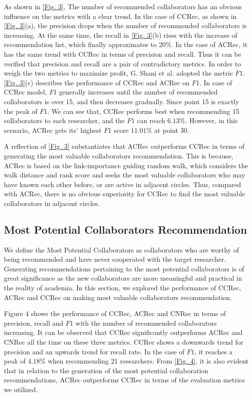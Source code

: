 \documentclass[10pt]{article}
\begin{document}
As shown in \autoref{Fig. 3}, The number of recommended collaborators has an obvious influence on the metrics with a clear trend. In the case of CCRec, as shown in \autoref{Fig. 3}(a), the precision drops when the number of recommended collaborators is increasing. At the same time, the recall in \autoref{Fig. 3}(b) rises with the increase of recommendation list, which finally approximates to $20\%$. In the case of ACRec, it has the same trend with CCRec in terms of precision and recall. Thus it can be verified that precision and recall are a pair of contradictory metrics. In order to weigh the two metrics to maximize profit, G. Shani et al. \cite{shani2011evaluating} adopted the metric $F1$. \autoref{Fig. 3}(c) describes the performance of CCRec and ACRec on $F1$. In case of CCRec model, $F1$ generally increases until the number of recommended collaborators is over 15, and then decreases gradually. Since point 15 is exactly the peak of $F1$. We can see that, CCRec performs best when recommending 15 collaborators to each researcher, and the $F1$ can reach $6.13\%$. However, in this scenario, ACRec gets its' highest $F1$ score $11.01\%$ at point 30.

A reflection of \autoref{Fig. 3} substantiates that ACRec outperforms CCRec in terms of generating the most valuable collaborators recommendation. This is because, ACRec is based on the link-importance guiding random walk, which considers the walk distance and rank score and seeks the most valuable collaborators who may have known each other before, or are active in adjacent circles. Thus, compared with ACRec, there is no obvious superiority for CCRec to find the most valuable collaborators in adjacent circles.

\subsection*{Most Potential Collaborators Recommendation}
We define the Most Potential Collaborators as collaborators who are worthy of being recommended and have never cooperated with the target researcher. Generating recommendations pertaining to the most potential collaborators is of great significance as the new collaborators are more meaningful and practical in the reality of academia. In this section, we explored the performance of CCRec, ACRec and CCRec on making most valuable collaborators recommendation.

Figure 4 shows the performance of CCRec, ACRec and CNRec in terms of precision, recall and $F1$ with the number of recommended collaborators increasing. It can be observed that CCRec significantly outperforms ACRec and CNRec all the time on these three metrics. CCRec shows a downwards trend for precision and an upwards trend for recall rate. In the case of $F1$, it reaches a peak of $4.18\%$ when recommending 21 researchers. From \autoref{Fig. 4}, it is also evident that in relation to the generation of the most potential collaboration recommendations, ACRec outperforms CCRec in terms of the evaluation metrics we utilized.
\end{document}
